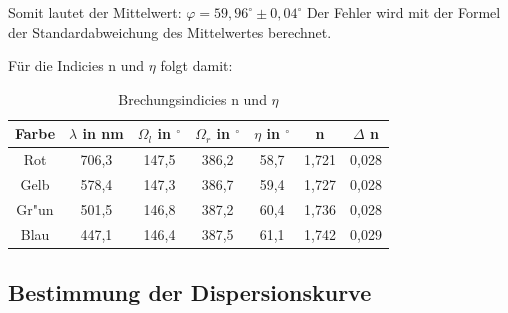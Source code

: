 Somit lautet der Mittelwert:
$\varphi = 59,96^\circ \pm 0,04^\circ$ Der Fehler wird mit der Formel der Standardabweichung des Mittelwertes
berechnet.

Für die Indicies n und $\eta$ folgt damit:
\begin{table}[h]
\begin{center}
\begin{tabular}[c]{ccccccc}
Farbe & $\lambda$ in nm & $\Omega_l$  in $^\circ$ & $\Omega_r$  in $^\circ$ & $\eta$  in $^\circ$ & n & $\Delta$ n \\ \hline
Rot & 706,3 & 147,5 & 386,2 & 58,7 & 1,721&  0,028\\
Gelb & 578,4 & 147,3 & 386,7 & 59,4 & 1,727&  0,028\\
Gr"un & 501,5 & 146,8 & 387,2 & 60,4 & 1,736& 0,028\\
Blau & 447,1 & 146,4 & 387,5 &  61,1 & 1,742& 0,029\\
\end{tabular}
\caption{Brechungsindicies n und $\eta$}
\end{center}
\end{table}

\subsection{Bestimmung der Dispersionskurve}

